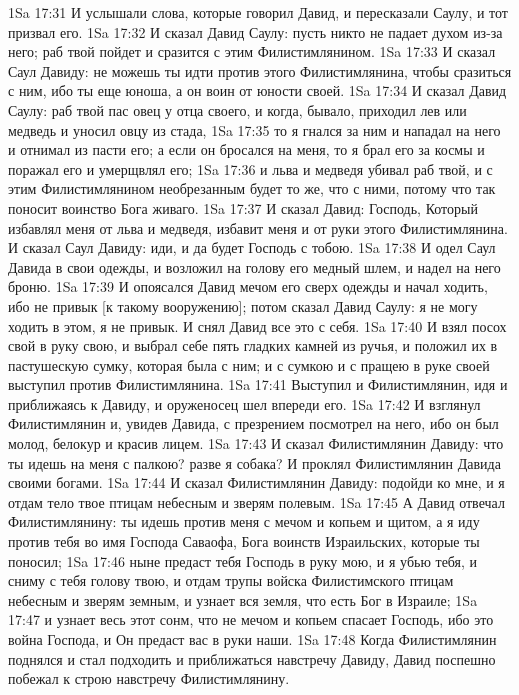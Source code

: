 1Sa 17:31  И услышали слова, которые говорил Давид, и пересказали Саулу, и тот призвал его.
1Sa 17:32  И сказал Давид Саулу: пусть никто не падает духом из-за него; раб твой пойдет и сразится с этим Филистимлянином.
1Sa 17:33  И сказал Саул Давиду: не можешь ты идти против этого Филистимлянина, чтобы сразиться с ним, ибо ты еще юноша, а он воин от юности своей.
1Sa 17:34  И сказал Давид Саулу: раб твой пас овец у отца своего, и когда, бывало, приходил лев или медведь и уносил овцу из стада,
1Sa 17:35  то я гнался за ним и нападал на него и отнимал из пасти его; а если он бросался на меня, то я брал его за космы и поражал его и умерщвлял его;
1Sa 17:36  и льва и медведя убивал раб твой, и с этим Филистимлянином необрезанным будет то же, что с ними, потому что так поносит воинство Бога живаго.
1Sa 17:37  И сказал Давид: Господь, Который избавлял меня от льва и медведя, избавит меня и от руки этого Филистимлянина. И сказал Саул Давиду: иди, и да будет Господь с тобою.
1Sa 17:38  И одел Саул Давида в свои одежды, и возложил на голову его медный шлем, и надел на него броню.
1Sa 17:39  И опоясался Давид мечом его сверх одежды и начал ходить, ибо не привык [к такому вооружению]; потом сказал Давид Саулу: я не могу ходить в этом, я не привык. И снял Давид все это с себя.
1Sa 17:40  И взял посох свой в руку свою, и выбрал себе пять гладких камней из ручья, и положил их в пастушескую сумку, которая была с ним; и с сумкою и с пращею в руке своей выступил против Филистимлянина.
1Sa 17:41  Выступил и Филистимлянин, идя и приближаясь к Давиду, и оруженосец шел впереди его.
1Sa 17:42  И взглянул Филистимлянин и, увидев Давида, с презрением посмотрел на него, ибо он был молод, белокур и красив лицем.
1Sa 17:43  И сказал Филистимлянин Давиду: что ты идешь на меня с палкою? разве я собака? И проклял Филистимлянин Давида своими богами.
1Sa 17:44  И сказал Филистимлянин Давиду: подойди ко мне, и я отдам тело твое птицам небесным и зверям полевым.
1Sa 17:45  А Давид отвечал Филистимлянину: ты идешь против меня с мечом и копьем и щитом, а я иду против тебя во имя Господа Саваофа, Бога воинств Израильских, которые ты поносил;
1Sa 17:46  ныне предаст тебя Господь в руку мою, и я убью тебя, и сниму с тебя голову твою, и отдам трупы войска Филистимского птицам небесным и зверям земным, и узнает вся земля, что есть Бог в Израиле;
1Sa 17:47  и узнает весь этот сонм, что не мечом и копьем спасает Господь, ибо это война Господа, и Он предаст вас в руки наши.
1Sa 17:48  Когда Филистимлянин поднялся и стал подходить и приближаться навстречу Давиду, Давид поспешно побежал к строю навстречу Филистимлянину.
